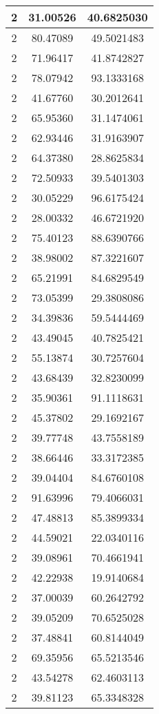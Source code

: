 \documentclass[
]{book}
\begin{document}
\begin{tabular}{c|c|c}
\hline
2 & 31.00526 & 40.6825030\\
\hline
2 & 80.47089 & 49.5021483\\
\hline
2 & 71.96417 & 41.8742827\\
\hline
2 & 78.07942 & 93.1333168\\
\hline
2 & 41.67760 & 30.2012641\\
\hline
2 & 65.95360 & 31.1474061\\
\hline
2 & 62.93446 & 31.9163907\\
\hline
2 & 64.37380 & 28.8625834\\
\hline
2 & 72.50933 & 39.5401303\\
\hline
2 & 30.05229 & 96.6175424\\
\hline
2 & 28.00332 & 46.6721920\\
\hline
2 & 75.40123 & 88.6390766\\
\hline
2 & 38.98002 & 87.3221607\\
\hline
2 & 65.21991 & 84.6829549\\
\hline
2 & 73.05399 & 29.3808086\\
\hline
2 & 34.39836 & 59.5444469\\
\hline
2 & 43.49045 & 40.7825421\\
\hline
2 & 55.13874 & 30.7257604\\
\hline
2 & 43.68439 & 32.8230099\\
\hline
2 & 35.90361 & 91.1118631\\
\hline
2 & 45.37802 & 29.1692167\\
\hline
2 & 39.77748 & 43.7558189\\
\hline
2 & 38.66446 & 33.3172385\\
\hline
2 & 39.04404 & 84.6760108\\
\hline
2 & 91.63996 & 79.4066031\\
\hline
2 & 47.48813 & 85.3899334\\
\hline
2 & 44.59021 & 22.0340116\\
\hline
2 & 39.08961 & 70.4661941\\
\hline
2 & 42.22938 & 19.9140684\\
\hline
2 & 37.00039 & 60.2642792\\
\hline
2 & 39.05209 & 70.6525028\\
\hline
2 & 37.48841 & 60.8144049\\
\hline
2 & 69.35956 & 65.5213546\\
\hline
2 & 43.54278 & 62.4603113\\
\hline
2 & 39.81123 & 65.3348328\\

\end{tabular}
\end{document}
